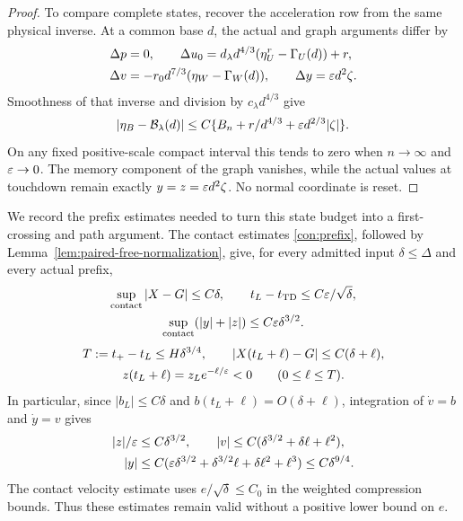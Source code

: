 \begin{proof}
To compare complete states, recover the acceleration row from the
same physical inverse.
At a common base $d$, the actual and graph arguments differ by
\begin{equation}
 \begin{split}
 \Delta p&=0,\qquad
 \Delta u_0=d_\lambda d^{4/3}
       (\eta_U^r-\Gamma_U(d))+r,\\
 \Delta v&=-r_0d^{7/3}(\eta_W-\Gamma_W(d)),\qquad
 \Delta y=\varepsilon d^2\zeta.
 \end{split}
 \label{path:inverse-arguments}
\end{equation}
Smoothness of that inverse and division by $c_\lambda d^{4/3}$ give
\begin{equation}
 |\eta_B-\mathcal B_\lambda(d)|
 \le C\{B_n+r/d^{4/3}+\varepsilon d^{2/3}|\zeta|\}.
 \label{path:dependent-row}
\end{equation}
On any fixed positive-scale compact interval this tends to zero
when $n\to\infty$ and $\varepsilon\to0$.  The memory component of the graph vanishes,
while the actual values at touchdown remain exactly
$y=z=\varepsilon d^2\zeta$.  No normal coordinate is reset.
\end{proof}

We record the prefix estimates needed to turn this state budget
into a first-crossing and path argument.  The contact estimates
\eqref{con:prefix}, followed by Lemma~\ref{lem:paired-free-normalization}, give,
for every admitted input $\delta\le\Delta$ and every actual prefix,
\begin{equation}
 \begin{gathered}
 \sup_{\rm contact}|X-G|\le C\delta,
 \qquad t_L-t_{\rm TD}\le C\varepsilon/\sqrt\delta,\\
 \sup_{\rm contact}(|y|+|z|)\le C\varepsilon\delta^{3/2}.
 \end{gathered}
 \label{path:contact-tube}
\end{equation}
\begin{equation}
 \begin{gathered}
 T:=t_+-t_L\le H\delta^{3/4},\qquad
 |X(t_L+\ell)-G|\le C(\delta+\ell),\\
 z(t_L+\ell)=z_Le^{-\ell/\varepsilon}<0
 \qquad(0\le\ell\le T).
 \end{gathered}
 \label{path:free-tube}
\end{equation}
In particular, since $|b_L|\le C\delta$ and
$b(t_L+\ell)=O(\delta+\ell)$, integration of $\dot v=b$ and
$\dot y=v$ gives
\begin{equation}
 \begin{split}
 |z|/\varepsilon&\le C\delta^{3/2},\qquad
 |v|\le C(\delta^{3/2}+\delta\ell+\ell^2),\\
 |y|&\le C(\varepsilon\delta^{3/2}+\delta^{3/2}\ell
                       +\delta\ell^2+\ell^3)\le C\delta^{9/4}.
 \end{split}
 \label{path:free-normal-tube}
\end{equation}
The contact velocity estimate uses $e/\sqrt\delta\le C_0$ in
the weighted compression bounds.  Thus these estimates remain valid
without a positive lower bound on $e$.

